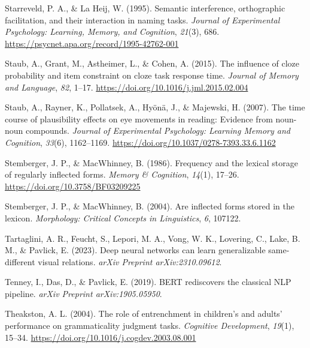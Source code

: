 \documentclass[
  12pt,
  letterpaper,
]{scrreport}
\newlength{\cslhangindent}
\newenvironment{CSLReferences}[2] %
 {\begin{list}{}{%
  \setlength{\itemindent}{0pt}
  \setlength{\leftmargin}{0pt}
  \setlength{\parsep}{0pt}
  \ifodd #1
   \setlength{\leftmargin}{\cslhangindent}
   \setlength{\itemindent}{-1\cslhangindent}
  \fi
  \setlength{\itemsep}{#2\baselineskip}}}
 {\end{list}}
\begin{document}
\begin{CSLReferences}{1}{0}
Starreveld, P. A., \& La Heij, W. (1995). Semantic interference,
orthographic facilitation, and their interaction in naming tasks.
\emph{Journal of Experimental Psychology: Learning, Memory, and
Cognition}, \emph{21}(3), 686.
\url{https://psycnet.apa.org/record/1995-42762-001}

Staub, A., Grant, M., Astheimer, L., \& Cohen, A. (2015). The influence
of cloze probability and item constraint on cloze task response time.
\emph{Journal of Memory and Language}, \emph{82}, 1--17.
\url{https://doi.org/10.1016/j.jml.2015.02.004}

Staub, A., Rayner, K., Pollatsek, A., Hyönä, J., \& Majewski, H. (2007).
The time course of plausibility effects on eye movements in reading:
Evidence from noun-noun compounds. \emph{Journal of Experimental
Psychology: Learning Memory and Cognition}, \emph{33}(6), 1162--1169.
\url{https://doi.org/10.1037/0278-7393.33.6.1162}

Stemberger, J. P., \& MacWhinney, B. (1986). Frequency and the lexical
storage of regularly inflected forms. \emph{Memory \& Cognition},
\emph{14}(1), 17--26. \url{https://doi.org/10.3758/BF03209225}

Stemberger, J. P., \& MacWhinney, B. (2004). Are inflected forms stored
in the lexicon. \emph{Morphology: Critical Concepts in Linguistics},
\emph{6}, 107122.

Tartaglini, A. R., Feucht, S., Lepori, M. A., Vong, W. K., Lovering, C.,
Lake, B. M., \& Pavlick, E. (2023). Deep neural networks can learn
generalizable same-different visual relations. \emph{arXiv Preprint
arXiv:2310.09612}.

Tenney, I., Das, D., \& Pavlick, E. (2019). BERT rediscovers the
classical NLP pipeline. \emph{arXiv Preprint arXiv:1905.05950}.

Theakston, A. L. (2004). The role of entrenchment in children{'}s and
adults{'} performance on grammaticality judgment tasks. \emph{Cognitive
Development}, \emph{19}(1), 15--34.
\url{https://doi.org/10.1016/j.cogdev.2003.08.001}


\end{CSLReferences}
\end{document}
